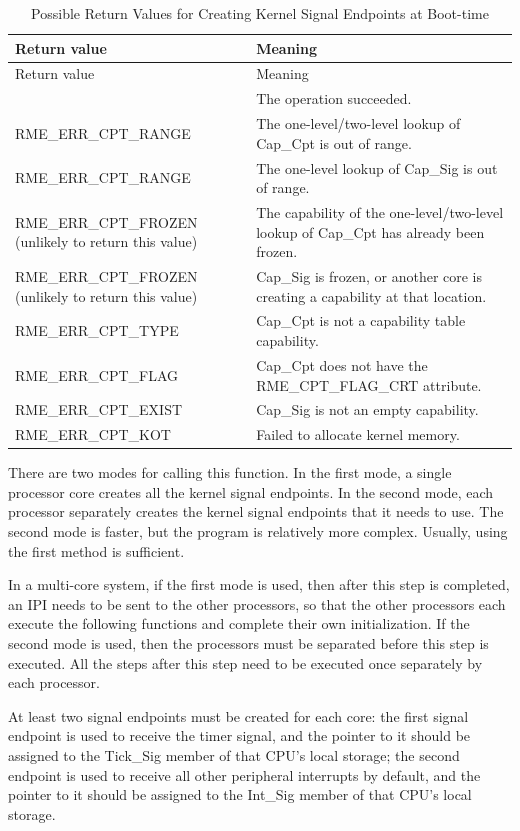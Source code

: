 \begin{xltabular}{\textwidth}{@{}>{\hsize\raggedright\arraybackslash}X>{\hsize\raggedright\arraybackslash}X@{}}
\caption{Possible Return Values for Creating Kernel Signal Endpoints at Boot-time}\label{tab:7-58-create-kernel-signal-endpoint-at-boot-return-values}\\
\toprule
Return value & Meaning\tabularnewline
\endfirsthead
\toprule
Return value & Meaning\tabularnewline
\midrule
\endhead
\bottomrule
{} & The operation succeeded.\tabularnewline
    RME\_ERR\_CPT\_RANGE & The one-level/two-level lookup of Cap\_Cpt is out of range.\tabularnewline
    RME\_ERR\_CPT\_RANGE & The one-level lookup of Cap\_Sig is out of range.\tabularnewline
    RME\_ERR\_CPT\_FROZEN (unlikely to return this value) & The capability of the one-level/two-level lookup of Cap\_Cpt has already been frozen.\tabularnewline
    RME\_ERR\_CPT\_FROZEN (unlikely to return this value) & Cap\_Sig is frozen, or another core is creating a capability at that location.\tabularnewline
    RME\_ERR\_CPT\_TYPE & Cap\_Cpt is not a capability table capability.\tabularnewline
    RME\_ERR\_CPT\_FLAG & Cap\_Cpt does not have the RME\_CPT\_FLAG\_CRT attribute.\tabularnewline
    RME\_ERR\_CPT\_EXIST & Cap\_Sig is not an empty capability.\tabularnewline
    RME\_ERR\_CPT\_KOT & Failed to allocate kernel memory.\tabularnewline
\end{xltabular}
\nopagebreak[4]

There are two modes for calling this function. In the first mode, a single processor core creates all the kernel signal endpoints. In the second mode, each processor separately creates the kernel signal endpoints that it needs to use. The second mode is faster, but the program is relatively more complex. Usually, using the first method is sufficient.

In a multi-core system, if the first mode is used, then after this step is completed, an IPI needs to be sent to the other processors, so that the other processors each execute the following functions and complete their own initialization. If the second mode is used, then the processors must be separated before this step is executed. All the steps after this step need to be executed once separately by each processor.

At least two signal endpoints must be created for each core: the first signal endpoint is used to receive the timer signal, and the pointer to it should be assigned to the Tick\_Sig member of that CPU's local storage; the second endpoint is used to receive all other peripheral interrupts by default, and the pointer to it should be assigned to the Int\_Sig member of that CPU's local storage.

